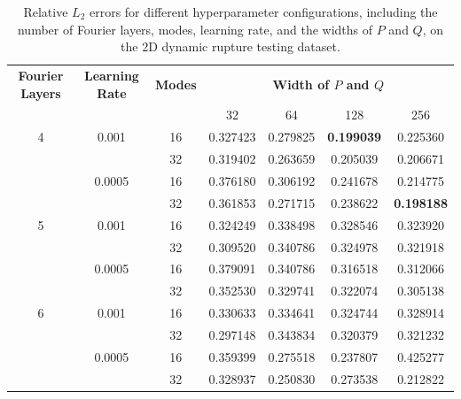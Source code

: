 \documentclass[draft]{agujournal2019}
\begin{document}
\begin{table}[ht!]
\caption{Relative \( L_2 \) errors for different hyperparameter configurations, including the number of Fourier layers, modes, learning rate, and the widths of \( P \) and \( Q \), on the 2D dynamic rupture testing dataset.}
    \centering
    \begin{tabular}{ccccccc}
        \toprule
        \textbf{Fourier Layers} & \textbf{Learning Rate} & \textbf{Modes} & \multicolumn{4}{c}{\textbf{Width of \(P\) and \(Q\)}} \\
        \cmidrule(lr){4-7}
        & & & 32 & 64 & 128 & 256 \\
        \midrule
        4 & 0.001  & 16  & 0.327423 & 0.279825 & \textbf{0.199039}  & 0.225360  \\
         &         & 32  & 0.319402 & 0.263659  & 0.205039  & 0.206671  \\
         & 0.0005  & 16  & 0.376180 & 0.306192  & 0.241678  & 0.214775  \\
         &         & 32  & 0.361853 & 0.271715  & 0.238622  & \textbf{0.198188}  \\
        \midrule
        5 & 0.001  & 16  & 0.324249  & 0.338498  & 0.328546  & 0.323920  \\
         &         & 32  & 0.309520  & 0.340786  & 0.324978  & 0.321918  \\
         & 0.0005  & 16  & 0.379091  & 0.340786  & 0.316518  & 0.312066  \\
         &         & 32  & 0.352530  & 0.329741  & 0.322074  & 0.305138  \\
        \midrule
        6 & 0.001  & 16  & 0.330633  & 0.334641  & 0.324744  & 0.328914  \\
          &        & 32  & 0.297148  & 0.343834  & 0.320379  & 0.321232  \\
          & 0.0005 & 16  & 0.359399  & 0.275518  & 0.237807  & 0.425277  \\
          &        & 32  & 0.328937  & 0.250830  & 0.273538  & 0.212822  \\
        \bottomrule
    \end{tabular}
    \label{tab:2D_hyperparam}
\end{table}
\end{document}
